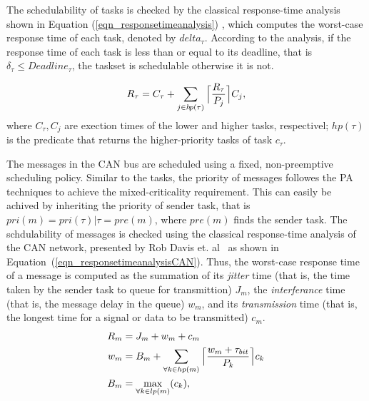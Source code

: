 {The schedulability of tasks is checked by the classical response-time analysis shown in Equation (\ref{eqn_responsetimeanalysis}) \cite{Baruah2011Response-timeSystems,Baruah2011Response-timeSystems}, which computes the worst-case response time of each task, denoted by $delta_\tau$. According to the analysis, if the response time of each task is less than or equal to its deadline, that is $\delta_\tau\leq Deadline_\tau$, the taskset is schedulable otherwise it is not. 

\begin{align}
\label{eqn_responsetimeanalysis}
R_\tau=C_\tau+\sum_{j\in h\!p(\tau)}
{
	\ceil[\Big]
	{
		\frac{R_\tau}{P_j}
	}C_j
},
\end{align}
where $C_\tau,C_j$ are exection times of the lower and higher tasks, respectivel; $h\!p(\tau)$ is the predicate that returns the higher-priority tasks of task $c_\tau$.


The messages in the CAN bus are scheduled using a fixed, non-preemptive scheduling policy. Similar to the tasks, the priority of messages followes the PA techniques to achieve the mixed-criticality requirement. This can easily be achived by inheriting the priority of sender task, that is $pri(m)=pri(\tau)|\tau = pre(m)$, where $pre(m)$ finds the sender task. The schdulability of messages is checked using the classical response-time analysis of the CAN network, presented by Rob Davis et. al~\cite{RobDavis-CAN-2007} as shown in Equation~(\ref{eqn_responsetimeanalysisCAN}). Thus, the worst-case response time of a message is computed as the summation of its \textit{jitter} time (that is, the time  taken by the sender task to queue for transmittion) $J_m$, the \textit{interferance} time (that is, the message delay in the queue) $w_m$, and its \textit{transmission} time  (that is, the longest time for a signal or data to be transmitted) $c_m$.
\begin{align}
\label{eqn_responsetimeanalysisCAN}
R_m&=J_m+w_m+c_m\\
\label{eqn_interference}
w_m&=B_m+
\sum_{\forall k\in hp(m)}
{
	\ceil[\Big]
	{
		\frac{w_m+\tau_{bit}}{P_k}
	}c_k
}\\
\label{eqn_iblocking}
B_m&=\max_{\forall k\in lp(m)}(c_k),
\end{align}

}
